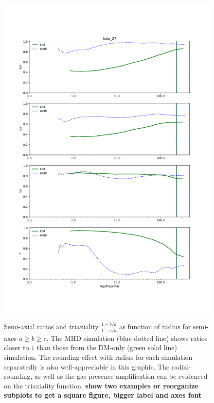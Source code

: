 \begin{figure}
\centering
{\includegraphics[width=1\columnwidth]{./pics/MHD_Vs_DM/level4_halo_27_DM_Vs_MHD.png}\label{fig:outterMHD}}
\caption{Semi-axial ratios and triaxiality $\frac{1-b/a}{1-c/a}$ as function of radius for semi-axes $a\geq b\geq c$. The MHD simulation (blue dotted line) shows ratios closer to $1$ than those from the DM-only (green solid line) simulation. The rounding effect with radius for each simulation separatedly is also well-appreciable in this graphic. The radial-rounding, as well as the gas-presence amplification can be evidenced on the triaxiality function. \textbf{show two examples or reorganize subplots to get a square figure, bigger label and axes font}}
\end{figure} 


